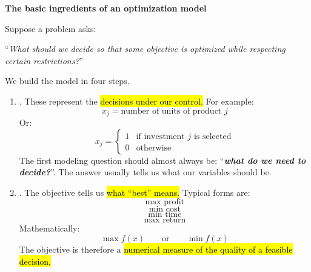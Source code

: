 \highspace
\begin{flushleft}
    \textcolor{Green3}{ \textbf{The basic ingredients of an optimization model}}
\end{flushleft}
Suppose a problem asks:
\begin{center}
    ``\emph{What should we decide so that some objective is optimized while respecting certain restrictions?}''
\end{center}
We build the model in four steps.
\begin{enumerate}
    \item {}. These represent the \hl{decisions under our control.} For example:
        \begin{equation*}
            x_j=\text{number of units of product }j
        \end{equation*}
        Or:
        \begin{equation*}
            x_j=
            \begin{cases}
                1 & \text{if investment }j\text{ is selected}\\
                0 & \text{otherwise}
            \end{cases}
        \end{equation*}
        The first modeling question should almost always be: ``\emph{\textbf{what do we need to decide?}}''. The answer usually tells us what our variables should be.

    \item {}. The objective tells us \hl{what ``best'' means.} Typical forms are:
        \begin{equation*}
            \max \text{ profit}
        \end{equation*}
        \begin{equation*}
            \min \text{ cost}
        \end{equation*}
        \begin{equation*}
            \min \text{ time}
        \end{equation*}
        \begin{equation*}
            \max \text{ return}
        \end{equation*}
        Mathematically:
        \begin{equation*}
            \max f(x)
            \qquad\text{or}\qquad
            \min f(x)
        \end{equation*}
        The objective is therefore a \hl{numerical measure of the quality of a feasible decision.}


\end{enumerate}
